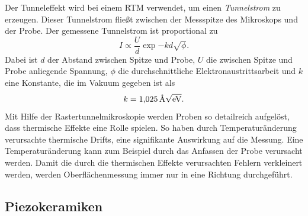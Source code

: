 Der Tunneleffekt wird bei einem RTM verwendet, um einen \emph{Tunnelstrom} zu erzeugen. Dieser Tunnelstrom
fließt zwischen der Messspitze des Mikroskops und der Probe.
Der gemessene Tunnelstrom ist proportional zu %
\begin{equation}
  \label{eq: tunnelstrom}
I\propto \frac{U}{d}\exp{-kd\sqrt{\phi}}.
\end{equation}
Dabei ist $d$ der Abstand zwischen Spitze und Probe, $U$ die zwischen Spitze und Probe anliegende Spannung,
$\phi$ die durchschnittliche Elektronaustrittsarbeit und $k$ eine Konstante, die im Vakuum gegeben ist als
\begin{equation*}
  k=\SI{1.025}{\per\angstrom\sqrt{\eV}}.
\end{equation*}
Mit Hilfe der Rastertunnelmikroskopie werden Proben so detailreich aufgelöst, dass thermische Effekte eine Rolle spielen. %
So haben durch Temperaturänderung verursachte thermische Drifts, eine signifikante Auswirkung auf die Messung. %
Eine Temperaturänderung kann zum Beispiel durch das Anfassen der Probe verursacht werden.
Damit die durch die thermischen Effekte verursachten Fehlern verkleinert werden,
werden Oberflächenmessung immer nur in eine Richtung durchgeführt.

\subsection{Piezokeramiken}


